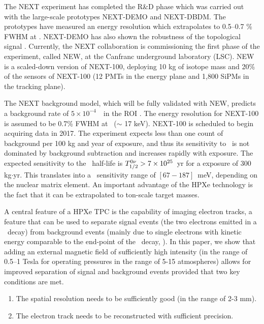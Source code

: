 \documentclass{JINST}
\begin{document}
The NEXT experiment has completed the R\&D phase which was carried out with the large-scale prototypes NEXT-DEMO and NEXT-DBDM. The prototypes have measured an energy resolution which extrapolates to 0.5--0.7 \% FWHM at \Qbb. NEXT-DEMO has also shown the robustness of the topological signal \cite{Alvarez:2012xda,Alvarez:2012kua,Alvarez:2013gxa,Lorca:2014sra}. Currently, the NEXT collaboration is commissioning the first phase of the experiment, called NEW, at the Canfranc underground laboratory (LSC). NEW is a scaled-down version of NEXT-100, deploying 10 kg of isotope mass and 20\% of the sensors of NEXT-100 (12 PMTs in the energy plane and  1,800 SiPMs in the tracking plane).

The NEXT background model, which will be fully validated with NEW, predicts a background rate of $5 \times 10^{-4}$~\ckky\ in the ROI \cite{Nebot-Guinot:2014raa}. The energy resolution for NEXT-100 is assumed to be 0.7\% FWHM at \Qbb\ ($\sim$ 17 keV). NEXT-100 is scheduled to begin acquiring data in 2017. The experiment expects less than one count of background per 100 kg and year of exposure, and thus its sensitivity to \Tonu\ is not dominated by background subtraction and increases rapidly with exposure. The expected sensitivity to the \bbonu\ half-life is $T_{1/2}^{0\nu} > 7 \times 10^{25}$~yr for a exposure of 300 kg$\cdot$yr. This translates into a \mbb\ sensitivity range of $[67-187]$~meV, depending on the nuclear matrix element. An important advantage of the HPXe technology is the fact that it can be extrapolated to ton-scale target masses.


A central feature of a HPXe TPC is the capability of imaging electron tracks, a feature that can be used to separate signal events (the two electrons emitted in a \bbonu\ decay) from background events (mainly due to single electrons with kinetic energy comparable to the end-point of the \bbonu\ decay, \Qbb). In this paper, we show that adding an external magnetic field of sufficiently high intensity (in the range of 0.5--1 Tesla for operating pressures in the range of 5-15 atmospheres) allows for improved separation of signal and background events provided that two key conditions are met. 
\begin{enumerate}
\item The spatial resolution needs to be sufficiently good (in the range of 2-3 mm). 
\item The electron track needs to be reconstructed with sufficient precision. 
\end{enumerate}
\end{document}
